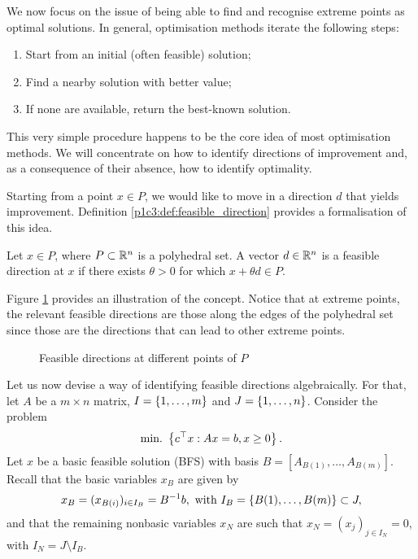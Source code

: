 We now focus on the issue of being able to find and recognise extreme points as optimal solutions. In general, optimisation methods iterate the following steps:
%
\begin{enumerate}
	\item Start from an initial (often feasible) solution;
	\item Find a nearby solution with better value;
	\item If none are available, return the best-known solution.	
\end{enumerate}
%
This very simple procedure happens to be the core idea of most optimisation methods. We will concentrate on how to identify directions of improvement and, as a consequence of their absence, how to identify optimality.

Starting from a point $x \in P$, we would like to move in a direction $d$ that yields improvement. Definition \ref{p1c3:def:feasible_direction} provides a formalisation of this idea.

\begin{definition} \label{p1c3:def:feasible_direction}
	Let $x \in P$, where $P \subset \mathbb{R}^n$ is a polyhedral set. A vector $d \in \mathbb{R}^n$ is a feasible direction at $x$ if there exists $\theta > 0$ for which $x + \theta d \in P$.
\end{definition}

Figure \ref{p1c3:fig:feasible_directions} provides an illustration of the concept. Notice that at extreme points, the relevant feasible directions are those along the edges of the polyhedral set since those are the directions that can lead to other extreme points.
  
\begin{figure}[h]
	\caption{Feasible directions at different points of $P$} \label{p1c3:fig:feasible_directions}
\end{figure}

Let us now devise a way of identifying feasible directions algebraically. For that, let $A$ be a $m \times n$ matrix, $I = \left\{ 1,\dots,m \right \}$ and $J = \left\{ 1,\dots,n \right \}$. Consider the problem 
%
\begin{equation*}
	\mathop{\text{min.~}} \left\{ c^\top x : Ax = b, x \geq 0 \right \}.	
\end{equation*}
%
Let $x$ be a basic feasible solution (BFS) with basis $B = [A_{B(1)}, \dots, A_{B(m)}]$. Recall that the basic variables $x_B$ are given by
%
\begin{equation*}
	x_B = (x_{B(i)})_{i \in I_B} = B^{-1}b, \text{ with } I_B = \left\{ B(1), \dots, B(m) \right \} \subset J,	
\end{equation*}
%
and that the remaining nonbasic variables $x_N$ are such that $x_N = (x_j)_{j \in I_N} = 0$, with $I_N = J \setminus I_B$.


